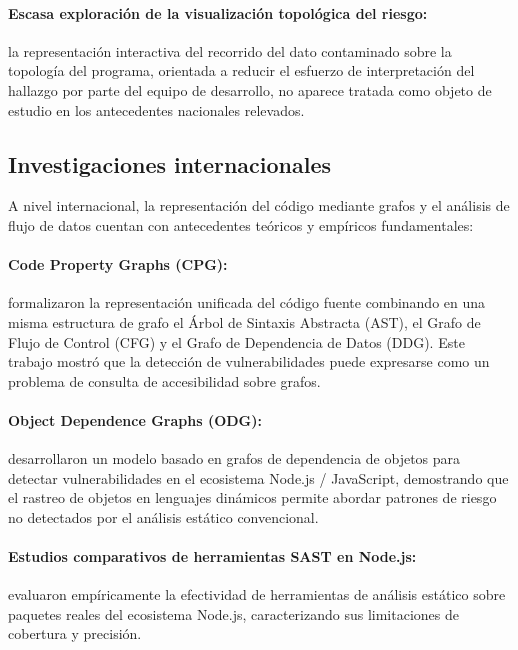 \paragraph{Escasa exploración de la visualización topológica del riesgo:} la representación interactiva del recorrido del dato contaminado sobre la topología del programa, orientada a reducir el esfuerzo de interpretación del hallazgo por parte del equipo de desarrollo, no aparece tratada como objeto de estudio en los antecedentes nacionales relevados.

\subsection{Investigaciones internacionales}\label{sec:n3.1.3}

A nivel internacional, la representación del código mediante grafos y el análisis de flujo de datos cuentan con antecedentes teóricos y empíricos fundamentales:

\paragraph{Code Property Graphs (CPG):} \citet{yamaguchi2014} formalizaron la representación unificada del código fuente combinando en una misma estructura de grafo el Árbol de Sintaxis Abstracta (AST), el Grafo de Flujo de Control (CFG) y el Grafo de Dependencia de Datos (DDG). Este trabajo mostró que la detección de vulnerabilidades puede expresarse como un problema de consulta de accesibilidad sobre grafos.

\paragraph{Object Dependence Graphs (ODG):} \citet{li2022} desarrollaron un modelo basado en grafos de dependencia de objetos para detectar vulnerabilidades en el ecosistema Node.js / JavaScript, demostrando que el rastreo de objetos en lenguajes dinámicos permite abordar patrones de riesgo no detectados por el análisis estático convencional.

\paragraph{Estudios comparativos de herramientas SAST en Node.js:} \citet{brito2023} evaluaron empíricamente la efectividad de herramientas de análisis estático sobre paquetes reales del ecosistema Node.js, caracterizando sus limitaciones de cobertura y precisión.

